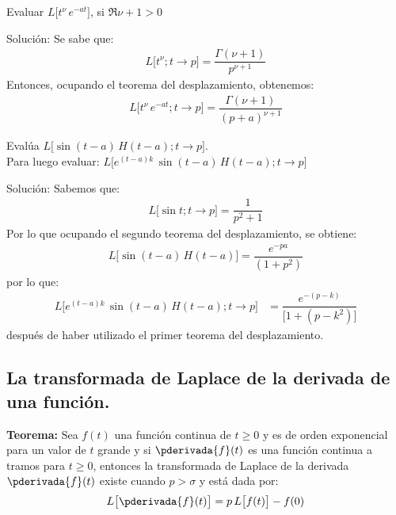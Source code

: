 \begin{ejemplo}
Evaluar $L \big[  t^{\nu} \, e^{-a t}  \big]$, si $\Re{\nu + 1} > 0$

Solución: Se sabe que:
\begin{align*}
L \big[  t^{\nu}; t \to p  \big] = \dfrac{\Gamma (\nu + 1)}{p^{\nu+1}}
\end{align*}
Entonces, ocupando el teorema del desplazamiento, obtenemos:
\begin{align*}
L \big[  t^{\nu} \, e^{-a t}; t \to p  \big] = \dfrac{\Gamma (\nu + 1)}{(p + a)^{\nu+1}}
\end{align*}
\end{ejemplo}
\begin{ejemplo}
Evalúa $L \big[ \sin (t - a) \, H (t- a); t \to p  \big]$. \\
Para luego evaluar: $L \big[  e^{(t-a) k} \, \sin (t - a) \, H(t- a); t \to p  \big]$

Solución: Sabemos que:
\begin{align*}
L \big[  \sin t; t \to p  \big] = \dfrac{1}{p^{2} + 1}
\end{align*}
Por lo que ocupando el segundo teorema del desplazamiento, se obtiene:
\begin{align*}
L \big[  \sin (t - a) \, H (t- a)  \big] = \dfrac{e^{-p a}}{(1 + p^{2})}
\end{align*}
por lo que:
\begin{align*}
L \big[  e^{(t-a) k} \, \sin (t - a) \, H(t- a); t \to p  \big] &= \dfrac{e^{-(p - k)}}{\big[  1 + (p - k^{2})  \big]}
\end{align*}
después de haber utilizado el primer teorema del desplazamiento.
\end{ejemplo}

\subsection{La transformada de Laplace de la derivada de una función.}

\noindent \textbf{Teorema: } Sea $f (t)$ una función continua de $t \geq 0$ y es de orden exponencial para un valor de $t$ grande y si $\pderivada{f}(t)$ es una función continua a tramos para $t \geq 0$, entonces la transformada de Laplace de la derivada $\pderivada{f}(t)$ existe cuando $p > \sigma$ y está dada por:
\begin{align*}
L \big[  \pderivada{f} (t)  \big] = p \, L \big[  f (t)  \big] - f(0)
\end{align*}

